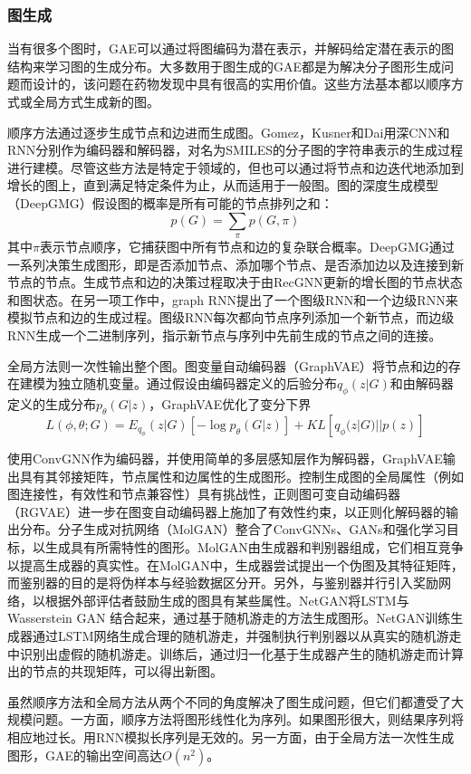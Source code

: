 \subsubsection{图生成}

当有很多个图时，GAE可以通过将图编码为潜在表示，并解码给定潜在表示的图结构来学习图的生成分布。大多数用于图生成的GAE都是为解决分子图形生成问题而设计的，该问题在药物发现中具有很高的实用价值。这些方法基本都以顺序方式或全局方式生成新的图。

顺序方法通过逐步生成节点和边进而生成图。Gomez\cite{gomez2018automatic}，Kusner\cite{kusner2017grammar}和Dai\cite{dai2018syntax}用深CNN和RNN分别作为编码器和解码器，对名为SMILES的分子图的字符串表示的生成过程进行建模。尽管这些方法是特定于领域的，但也可以通过将节点和边迭代地添加到增长的图上，直到满足特定条件为止，从而适用于一般图。图的深度生成模型（DeepGMG）\cite{li2018learning}假设图的概率是所有可能的节点排列之和：
\[p(G) = \sum_{\pi}p(G, \pi)\]
其中$\pi$表示节点顺序，它捕获图中所有节点和边的复杂联合概率。DeepGMG通过一系列决策生成图形，即是否添加节点、添加哪个节点、是否添加边以及连接到新节点的节点。生成节点和边的决策过程取决于由RecGNN更新的增长图的节点状态和图状态。在另一项工作中，graph RNN\cite{you2018graphrnn}提出了一个图级RNN和一个边级RNN来模拟节点和边的生成过程。图级RNN每次都向节点序列添加一个新节点，而边级RNN生成一个二进制序列，指示新节点与序列中先前生成的节点之间的连接。

全局方法则一次性输出整个图。图变量自动编码器（GraphVAE）\cite{simonovsky2018graphvae}将节点和边的存在建模为独立随机变量。通过假设由编码器定义的后验分布$q_{\phi}(z|G)$和由解码器定义的生成分布$p_{\theta}(G|z)$，GraphVAE优化了变分下界
\[L(\phi, \theta;G) = E_{q_{\phi}}(z|G)[-\log p_{\theta}(G|z)] + KL[q_{\phi}(z|G)||p(z)]\]

使用ConvGNN作为编码器，并使用简单的多层感知层作为解码器，GraphVAE输出具有其邻接矩阵，节点属性和边属性的生成图形。控制生成图的全局属性（例如图连接性，有效性和节点兼容性）具有挑战性，正则图可变自动编码器（RGVAE）\cite{ma2018constrained}进一步在图变自动编码器上施加了有效性约束，以正则化解码器的输出分布。分子生成对抗网络（MolGAN）\cite{de2018molgan}整合了ConvGNNs、GANs和强化学习目标，以生成具有所需特性的图形。MolGAN由生成器和判别器组成，它们相互竞争以提高生成器的真实性。在MolGAN中，生成器尝试提出一个伪图及其特征矩阵，而鉴别器的目的是将伪样本与经验数据区分开。另外，与鉴别器并行引入奖励网络，以根据外部评估者鼓励生成的图具有某些属性。NetGAN\cite{bojchevski2018netgan}将LSTM与Wasserstein GAN \cite{arjovsky2017wasserstein}结合起来，通过基于随机游走的方法生成图形。NetGAN训练生成器通过LSTM网络生成合理的随机游走，并强制执行判别器以从真实的随机游走中识别出虚假的随机游走。训练后，通过归一化基于生成器产生的随机游走而计算出的节点的共现矩阵，可以得出新图。

虽然顺序方法和全局方法从两个不同的角度解决了图生成问题，但它们都遭受了大规模问题。一方面，顺序方法将图形线性化为序列。如果图形很大，则结果序列将相应地过长。用RNN模拟长序列是无效的。另一方面，由于全局方法一次性生成图形，GAE的输出空间高达$O(n^2)$。

